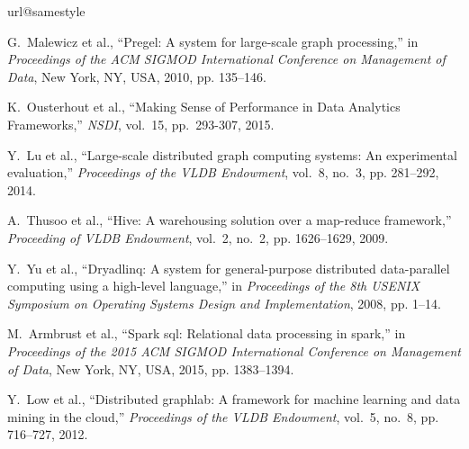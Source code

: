 \documentclass[10pt,journal,compsoc]{IEEEtran}
\begin{document}
\begin{thebibliography}{44}
\providecommand{\url}[1]{#1}
\csname url@samestyle\endcsname
\providecommand{\newblock}{\relax}
\providecommand{\bibinfo}[2]{#2}
\providecommand{\BIBentrySTDinterwordspacing}{\spaceskip=0pt\relax}
\providecommand{\BIBentryALTinterwordstretchfactor}{4}
\providecommand{\BIBentryALTinterwordspacing}{\spaceskip=\fontdimen2\font plus
\BIBentryALTinterwordstretchfactor\fontdimen3\font minus
  \fontdimen4\font\relax}
\providecommand{\BIBforeignlanguage}[2]{{%
\expandafter\ifx\csname l@#1\endcsname\relax
\typeout{** WARNING: IEEEtran.bst: No hyphenation pattern has been}%
\typeout{** loaded for the language `#1'. Using the pattern for}%
\typeout{** the default language instead.}%
\else
\language=\csname l@#1\endcsname
\fi
#2}}
\providecommand{\BIBdecl}{\relax}
\BIBdecl

G.~Malewicz et al., ``Pregel: A system for large-scale graph processing,'' in
  \emph{Proceedings of the ACM SIGMOD International Conference on Management of
  Data}, New York, NY, USA, 2010, pp. 135--146.

K.~Ousterhout et al., ``Making Sense of Performance in Data Analytics Frameworks,'' \emph{NSDI}, vol.~15, pp.~293-307, 2015.

Y.~Lu et al., ``Large-scale distributed graph computing
  systems: An experimental evaluation,'' \emph{Proceedings of the VLDB
  Endowment}, vol.~8, no.~3, pp. 281--292, 2014.

A.~Thusoo et al., ``Hive: A warehousing solution over a map-reduce
  framework,'' \emph{Proceeding of VLDB Endowment}, vol.~2, no.~2, pp.
  1626--1629, 2009.

Y.~Yu et al., ``Dryadlinq: A system for general-purpose distributed
  data-parallel computing using a high-level language,'' in \emph{Proceedings
  of the 8th USENIX Symposium on Operating Systems Design and Implementation},
  2008, pp. 1--14.

M.~Armbrust et al., ``Spark sql: Relational
  data processing in spark,'' in \emph{Proceedings of the 2015 ACM SIGMOD
  International Conference on Management of Data}, New York, NY, USA, 2015, pp. 1383--1394.

Y.~Low et al.,
  ``Distributed graphlab: A framework for machine learning and data mining in
  the cloud,'' \emph{Proceedings of the VLDB Endowment}, vol.~5, no.~8, pp.
  716--727, 2012.


\end{thebibliography}
\end{document}
